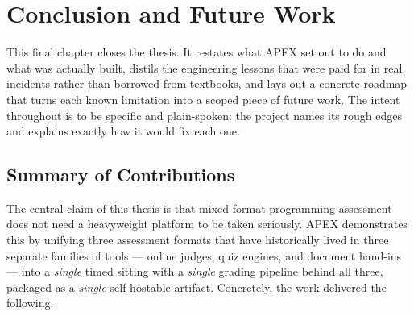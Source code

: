 \chapter{Conclusion and Future Work}\label{ch:ch13}

This final chapter closes the thesis. It restates what APEX set out to do and
what was actually built, distils the engineering lessons that were paid for in
real incidents rather than borrowed from textbooks, and lays out a concrete
roadmap that turns each known limitation into a scoped piece of future work.
The intent throughout is to be specific and plain-spoken: the project names its
rough edges and explains exactly how it would fix each one.

\section{Summary of Contributions}

The central claim of this thesis is that mixed-format programming assessment
does not need a heavyweight platform to be taken seriously. APEX demonstrates
this by unifying three assessment formats that have historically lived in three
separate families of tools --- online judges, quiz engines, and document
hand-ins --- into a \emph{single} timed sitting with a \emph{single} grading
pipeline behind all three, packaged as a \emph{single} self-hostable artifact.
Concretely, the work delivered the following.


